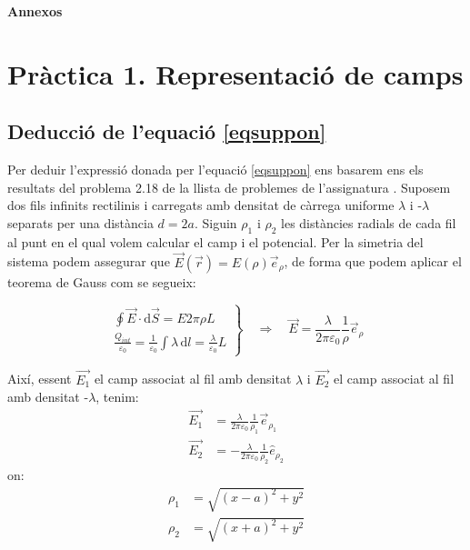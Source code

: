 \documentclass[a4paper,10.5pt]{report}
\begin{document}
\newpage
\begin{appendices}

\textbf{\Huge{Annexos}}
\renewcommand{\thesection}{\Alph{section}} %
\renewcommand{\theequation}{\thesection.\arabic{equation}} %
\setcounter{equation}{0} %
\section{Pràctica 1. Representació de camps}
\subsection{Deducció de l'equació \eqref{eqsuppon}}
\label{an:a1}
Per deduir l'expressió donada per l'equació \eqref{eqsuppon} ens basarem ens els resultats del problema 2.18 de la llista de problemes de l'assignatura \cite{ref1}. Suposem dos fils infinits rectilinis i carregats amb densitat de càrrega uniforme $\lambda$ i -$\lambda$ separats per una distància $d=2a$. Siguin $\rho_1$ i $\rho_2$ les distàncies radials de cada fil al punt en el qual volem calcular el camp i el potencial. Per la simetria del sistema podem assegurar que $\vec{E}(\vec{r}) = E(\rho) \vec{e}_{\rho}$, de forma que podem aplicar el teorema de Gauss com se segueix:

\[
\left.
\begin{array}{c}
	\oint \vec{E} \cdot \mathrm{d}\vec{S} = E 2\pi \rho L \\[10pt]
	\frac{Q_{int}}{\varepsilon_0} = \frac{1}{\varepsilon_0} \int \lambda \, \mathrm{d}l = \frac{\lambda}{\varepsilon_0} L
\end{array}
\right\}
\quad \Rightarrow \quad 
\vec{E} = \frac{\lambda}{2\pi \varepsilon_0} \frac{1}{\rho} \vec{e}_{\rho}
\]

Així, essent $\vec{E_1}$ el camp associat al fil amb densitat $\lambda$ i $\vec{E_2}$ el camp associat al fil amb densitat -$\lambda$, tenim:
\begin{align}
	\vec{E_1} & = \frac{\lambda}{2\pi \varepsilon_0} \frac{1}{\rho_1} \vec{e}_{\rho_1} \\
	\vec{E_2} & = -\frac{\lambda}{2\pi \varepsilon_0} \frac{1}{\rho_2} \hat{e}_{\rho_2}
\end{align}
on:
\begin{align}
	\rho_1 & = \sqrt{(x-a)^2+y^2} \\
	\rho_2 & = \sqrt{(x+a)^2+y^2} 
\end{align}


\end{appendices}
\end{document}
